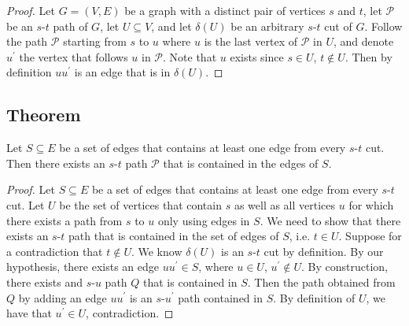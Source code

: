 \begin{proof}
    Let $ G=(V,E) $ be a graph with a distinct pair of vertices $ s $ and $ t $,
    let $ \mathcal{P} $ be an $ s $-$ t $ path of $ G $,  let $ U\subseteq V $,
    and let $ \delta(U) $ be an arbitrary $ s $-$ t $ cut of $ G $. Follow
    the path $ \mathcal{P} $ starting from $ s $ to $ u $ where $ u $ is the last vertex
    of $ \mathcal{P} $ in $ U $, and denote $ u^\prime $ the vertex that follows
    $ u $ in $ \mathcal{P} $. Note that $ u $ exists since $ s\in U $, $ t\notin U $.
    Then by definition $ uu^\prime $ is an edge that is in $ \delta(U) $.
\end{proof}

\begin{thmbox}
    \subsection{Theorem}
    Let $ S\subseteq E $ be a set of edges that contains at least one edge from every
    $s$-$t$ cut. Then there exists an $s$-$t$ path $ \mathcal{P} $ that is contained
    in the edges of $ S $.
\end{thmbox}

\begin{proof}
    Let $ S\subseteq E $ be a set of edges that contains at least one edge from every
    $s$-$t$ cut. Let $ U $ be the set of vertices that contain $ s $ as well
    as all vertices $ u $ for which there exists a path from $ s $ to
    $ u $ only using edges in $ S $. We need to show that there exists
    an $s$-$t$ path that is contained in the set of edges of $ S $, i.e.
    $ t\in U $. Suppose for a contradiction that $ t\notin U $. We know
    $ \delta(U) $ is an $s$-$t$ cut by definition. By our hypothesis,
    there exists an edge $ uu^\prime\in S $, where $ u\in U $, $ u^\prime\notin U $.
    By construction, there exists and $s$-$u$ path $Q$ that is contained in $ S $.
    Then the path obtained from $ Q $ by adding an edge $ uu^\prime $ is
    an $s$-$u^\prime$ path contained in $ S $. By definition of $ U $,
    we have that $ u^\prime\in U $, contradiction. 
\end{proof}

\begin{figure}
    \centering
    \def\svgwidth{\columnwidth}
    \scalebox{0.5}{}
\end{figure}

